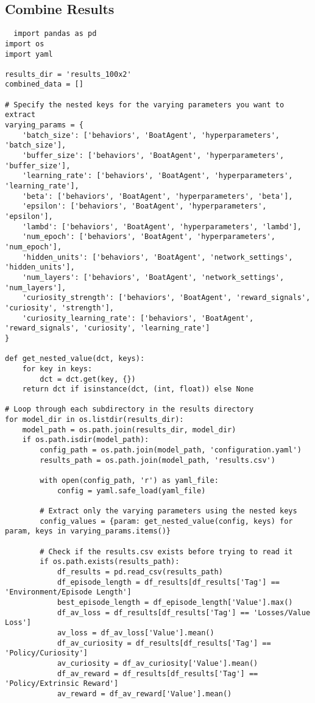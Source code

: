 \subsection{Combine Results}\label{sec:combine_results}
\begin{lstlisting}
  import pandas as pd
import os
import yaml

results_dir = 'results_100x2'
combined_data = []

# Specify the nested keys for the varying parameters you want to extract
varying_params = {
    'batch_size': ['behaviors', 'BoatAgent', 'hyperparameters', 'batch_size'],
    'buffer_size': ['behaviors', 'BoatAgent', 'hyperparameters', 'buffer_size'],
    'learning_rate': ['behaviors', 'BoatAgent', 'hyperparameters', 'learning_rate'],
    'beta': ['behaviors', 'BoatAgent', 'hyperparameters', 'beta'],
    'epsilon': ['behaviors', 'BoatAgent', 'hyperparameters', 'epsilon'],
    'lambd': ['behaviors', 'BoatAgent', 'hyperparameters', 'lambd'],
    'num_epoch': ['behaviors', 'BoatAgent', 'hyperparameters', 'num_epoch'],
    'hidden_units': ['behaviors', 'BoatAgent', 'network_settings', 'hidden_units'],
    'num_layers': ['behaviors', 'BoatAgent', 'network_settings', 'num_layers'],
    'curiosity_strength': ['behaviors', 'BoatAgent', 'reward_signals', 'curiosity', 'strength'],
    'curiosity_learning_rate': ['behaviors', 'BoatAgent', 'reward_signals', 'curiosity', 'learning_rate']
}

def get_nested_value(dct, keys):
    for key in keys:
        dct = dct.get(key, {})
    return dct if isinstance(dct, (int, float)) else None

# Loop through each subdirectory in the results directory
for model_dir in os.listdir(results_dir):
    model_path = os.path.join(results_dir, model_dir)
    if os.path.isdir(model_path):
        config_path = os.path.join(model_path, 'configuration.yaml')
        results_path = os.path.join(model_path, 'results.csv')
        
        with open(config_path, 'r') as yaml_file:
            config = yaml.safe_load(yaml_file)

        # Extract only the varying parameters using the nested keys
        config_values = {param: get_nested_value(config, keys) for param, keys in varying_params.items()}

        # Check if the results.csv exists before trying to read it
        if os.path.exists(results_path):
            df_results = pd.read_csv(results_path)
            df_episode_length = df_results[df_results['Tag'] == 'Environment/Episode Length']
            best_episode_length = df_episode_length['Value'].max()
            df_av_loss = df_results[df_results['Tag'] == 'Losses/Value Loss']
            av_loss = df_av_loss['Value'].mean()
            df_av_curiosity = df_results[df_results['Tag'] == 'Policy/Curiosity']
            av_curiosity = df_av_curiosity['Value'].mean()
            df_av_reward = df_results[df_results['Tag'] == 'Policy/Extrinsic Reward']
            av_reward = df_av_reward['Value'].mean()


\end{lstlisting}
